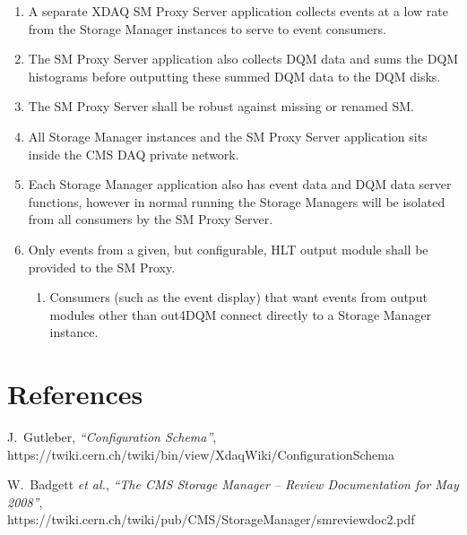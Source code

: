 \documentclass[]{article}
\begin{document}
\begin{enumerate}

\item A separate XDAQ SM Proxy Server application collects events at a low rate from the 
Storage Manager instances to serve to event consumers.

\item The SM Proxy Server application also collects DQM data and sums the DQM histograms before outputting these summed DQM data to the DQM disks.

\item The SM Proxy Server shall be robust against missing or renamed SM.

\item All Storage Manager instances and the SM Proxy Server application sits inside the CMS DAQ private network.

\item Each Storage Manager application also has event data and DQM data server functions, however in normal running the Storage Managers will be isolated from all consumers by the SM Proxy Server. 

\item Only events from a given, but configurable, HLT output module shall be provided to the SM Proxy.
\begin{enumerate}
\item Consumers (such as the event display) that want events from output modules other than out4DQM connect directly to a Storage Manager instance.
\end{enumerate}

\end{enumerate}



\section*{References}

\begin{thebibliography}{99}

J.~Gutleber, {\it ``Configuration Schema''},\\
{https://twiki.cern.ch/twiki/bin/view/XdaqWiki/ConfigurationSchema}

W.~Badgett {\it et al.}, 
{\it ``The CMS Storage Manager -- Review Documentation for May 2008''},\\
{https://twiki.cern.ch/twiki/pub/CMS/StorageManager/smreviewdoc2.pdf}

\end{thebibliography} 
\end{document}
